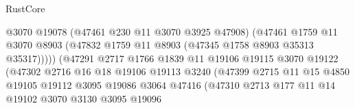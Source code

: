 \begin{lexlean}{RustCore}
\begin{coremodule}
                                            @3070
                                            @19078
                                            (@47461 @230 @11 @3070 @3925 @47908)
                                            (@47461
                                              @1759
                                              @11
                                              @3070
                                              @8903
                                              (@47832
                                                @1759
                                                @11
                                                @8903
                                                (@47345 @1758 @8903 @35313 @35317)))))
                                        (@47291
                                          @2717
                                          @1766
                                          @1839
                                          @11
                                          @19106
                                          @19115
                                          @3070
                                          @19122
                                          (@47302
                                            @2716
                                            @16
                                            @18
                                            @19106
                                            @19113
                                            @3240
                                            (@47399
                                              @2715
                                              @11
                                              @15
                                              @4850
                                              @19105
                                              @19112
                                              @3095
                                              @19086
                                              @3064
                                              @47416
                                              (@47310
                                                @2713
                                                @177
                                                @11
                                                @14
                                                @19102
                                                @3070
                                                @3130
                                                @3095
                                                @19096

\end{coremodule}
\end{lexlean}
